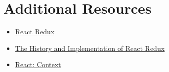 \section{Additional Resources}

\begin{itemize}[leftmargin=*]
    \item \href{https://react-redux.js.org}{React Redux}
    \item \href{https://blog.isquaredsoftware.com/2018/11/react-redux-history-implementation/}{The History and Implementation of React Redux}
    \item \href{http://reactjs.org/docs/context.html}{React: Context}
\end{itemize}
